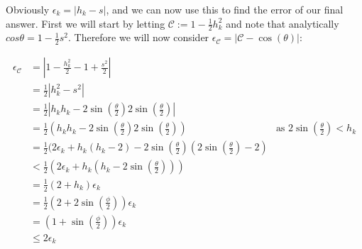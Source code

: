 Obviously \(\epsilon_k = |h_k - s|\), and we can now use this to find the error of our final answer. First we will start by letting \(\mathcal{C} := 1-\tfrac{1}{2}h_k^2\) and note that analytically \(cos\theta = 1 - \tfrac{1}{2}s^2\). Therefore we will now consider \(\epsilon_{\mathcal{C}} = |\mathcal{C} - \cos(\theta)|\):

\begin{displaymath}
\begin{align*}
	\epsilon_{\mathcal{C}} &= \left|1-\frac{h_k^2}{2}-1+\frac{s^2}{2}\right|\\
		&=\tfrac{1}{2}|h_k^2 - s^2|\\
		&=\tfrac{1}{2}|h_kh_k 
			- 2\sin(\tfrac{\theta}{2})2\sin(\tfrac{\theta}{2})|\\
		&=\tfrac{1}{2}(h_kh_k 
			- 2\sin(\tfrac{\theta}{2})2\sin(\tfrac{\theta}{2}))
			&\textrm{as \(2\sin(\tfrac{\theta}{2}) < h_k\)}\\
		&=\tfrac{1}{2}(2\epsilon_k + h_k(h_k-2) - 2\sin(\tfrac{\theta}{2})
			(2\sin(\tfrac{\theta}{2}) - 2)\\
		&<\tfrac{1}{2}(2\epsilon_k + h_k(h_k - 2\sin(\tfrac{\theta}{2})))\\
			&=\tfrac{1}{2}(2+h_k)\epsilon_k\\
		&=\frac{1}{2}(2 + 2\sin(\tfrac{\phi}{2}))\epsilon_k\\
		&=(1 + \sin(\tfrac{\phi}{2}))\epsilon_k\\
		&\le2\epsilon_k
\end{align*}
\end{displaymath}

